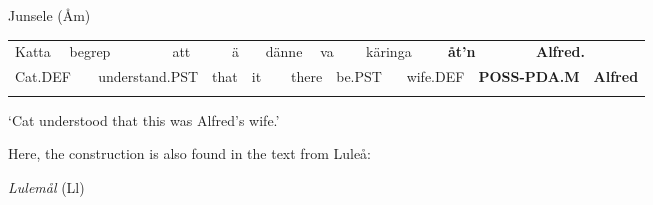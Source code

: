 \begin{listWWNumileveli}
\item 

\begin{styleExample}
\label{bkm:Ref137369876}Junsele (Åm)

\end{styleExample}

\end{listWWNumileveli}

\begin{tabular}{llllllllllllllllll}
\lsptoprule
Katta & \multicolumn{2}{l}{begrep

} & \multicolumn{2}{l}{att

} & \multicolumn{2}{l}{ä

} & \multicolumn{2}{l}{dänne

} & \multicolumn{2}{l}{va

} & \multicolumn{2}{l}{käringa

} & \multicolumn{2}{l}{{\bfseries åt’n}

} & \multicolumn{2}{l}{{\bfseries Alfred.}

} & \\
\multicolumn{2}{l}{Cat.DEF

} & \multicolumn{2}{l}{understand.PST

} & \multicolumn{2}{l}{that

} & \multicolumn{2}{l}{it

} & \multicolumn{2}{l}{there

} & \multicolumn{2}{l}{be.PST

} & \multicolumn{2}{l}{wife.DEF

} & \multicolumn{2}{l}{{\bfseries POSS-PDA.M}

} & \multicolumn{2}{l}{{\bfseries Alfred}

}\\
\lspbottomrule
\end{tabular}

\begin{styleTranslation}
‘Cat understood that this was Alfred’s wife.’

\end{styleTranslation}

Here, the construction is also found in the text from Luleå:

\begin{listWWNumileveli}
\item 

\begin{styleExample}
\textit{Lulemål} (Ll)

\end{styleExample}

\end{listWWNumileveli}

